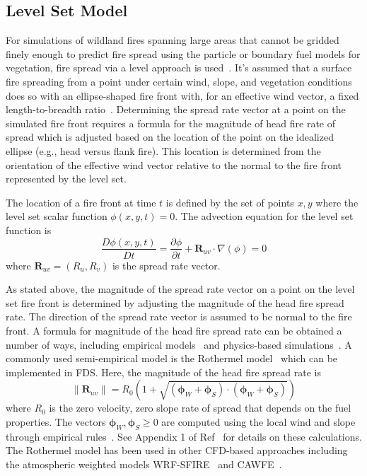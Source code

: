 \documentclass[journal,article,atmosphere,submit,moreauthors,pdftex]{Definitions/mdpi}
\begin{document}
\subsection{Level Set Model}

For simulations of wildland fires spanning large areas that cannot be gridded finely enough to predict fire spread using the particle or boundary fuel models for vegetation, fire spread via a level approach is used~\cite{Bova:IJWF2015}. It's assumed that a surface fire spreading from a point under certain wind, slope, and vegetation conditions does so with an ellipse-shaped fire front with, for an effective wind vector, a fixed length-to-breadth ratio~\cite{Finney:FARSITE,Bova:IJWF2015}. Determining the spread rate vector at a point on the simulated fire front requires a formula for the magnitude of head fire rate of spread which is adjusted based on the location of the point on the idealized ellipse (e.g., head versus flank fire). This location is determined from the orientation of the effective wind vector relative to the normal to the fire front represented by the level set. 

The location of a fire front at time $t$ is defined by the set of points $x,y$ where the level set scalar function $\phi(x,y,t)=0$. The advection equation for the level set function is
\begin{equation}
   \frac{D \phi(x,y,t)}{D t} =  \frac{\partial \phi}{\partial t} + \mathbf{R}_{uv} \cdot \nabla (\phi) = 0 \label{eqn:lset}
\end{equation}
where $\mathbf{R}_{uv}=(R_u,R_v)$ is the spread rate vector. 

As stated above, the magnitude of the spread rate vector on a point on the level set fire front is determined by adjusting the magnitude of the head fire spread rate. The direction of the spread rate vector is assumed to be normal to the fire front. A formula for magnitude of the head fire spread rate can be obtained a number of ways, including empirical models~\cite{Cheney:IJWF1998} and physics-based simulations~\cite{Mell:FBFC2019}. A commonly used semi-empirical model is the Rothermel model~\cite{Rothermel:1972,Albini:1976} which can be implemented in FDS. Here, the magnitude of the head fire spread rate is
\begin{equation}
  \|\mathbf{R}_{uv}\|=R_0 \left(1 + \sqrt{(\boldsymbol{\phi}_W+\boldsymbol{\phi}_S) \cdot (\boldsymbol{\phi}_W+\boldsymbol{\phi}_S) } \right)
\end{equation}
where $R_0$ is the zero velocity, zero slope rate of spread that depends on the fuel properties. The vectors $\boldsymbol{\phi}_W,\boldsymbol{\phi}_S \ge 0$ are computed using the local wind and slope through empirical rules~\cite{Wilson:1980}. See Appendix 1 of Ref~\cite{Bova:IJWF2015} for details on these calculations. The Rothermel model has been used in other CFD-based approaches including the atmospheric weighted models WRF-SFIRE~\cite{Mandel:2014} and CAWFE~\cite{Coen:2}. 
\end{document}
